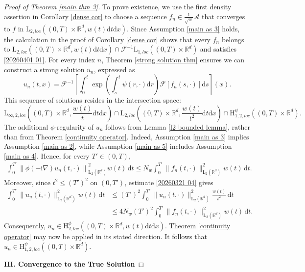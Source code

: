 \documentclass[11pt,reqno]{amsart}
\theoremstyle{definition}
\theoremstyle{remark}
\newcommand\bR{\mathbb{R}}
\newcommand\cA{\mathcal{A}}
\newcommand\cF{\mathcal{F}}
\numberwithin{equation}{section}
\begin{document}
\begin{proof}[Proof of Theorem \ref{main thm 3}]
To prove existence, we use the first density assertion in Corollary \ref{dense cor} to choose a sequence $f_n\in\frac{1}{\sqrt w}\cA$
that converges to $f$ in
$\mathrm{L}_{2,loc}\left((0,T)\times\bR^d,
w(t)\mathrm{d}t\mathrm{d}x\right)$. Since Assumption
\ref{main as 3} holds, the calculation in the proof of Corollary
\ref{dense cor} shows that every $f_n$ belongs to $\mathrm{L}_{2,loc}\left((0,T)\times\bR^d,w(t)\mathrm{d}t\mathrm{d}x\right)\cap\cF^{-1}\mathrm{L}_{1,loc}\left((0,T)\times\bR^d\right)$ and satisfies \eqref{20260401 01}.
For every index $n$, Theorem \ref{strong solution thm} ensures we can construct a strong solution $u_n$, expressed as
$$
u_n(t,x) = \cF^{-1}\left[ \int_0^t \exp\left(\int_s^t\psi(r,\cdot)\mathrm{d}r \right) \cF[f_n(s,\cdot)]\mathrm{d}s \right](x).
$$
This sequence of solutions resides in the intersection space:
$$
\mathrm{L}_{\infty,2, loc}\left( (0,T) \times \bR^d ,\frac{w(t)}{t}\mathrm{d}t \mathrm{d}x\right) \cap \mathrm{L}_{2, loc}\left( (0,T) \times \bR^d,\frac{w(t)}{t^2}\mathrm{d}t\mathrm{d}x \right) \cap  \mathrm{H}_{1,2,loc}^{\psi}\left( (0,T) \times \bR^d\right).
$$
The additional $\phi$-regularity of $u_n$ follows from Lemma
\ref{l2 bounded lemma}, rather than from Theorem
\ref{continuity operator}. Indeed, Assumption \ref{main as 3} implies
Assumption \ref{main as 2}, while Assumption \ref{main as 5} includes
Assumption \ref{main as 4}. Hence, for every $T'\in(0,T)$,
\begin{align*}
\int_0^{T'}\left\|
\phi(-\mathrm{i}\nabla)u_n(t,\cdot)
\right\|_{\mathrm L_2(\bR^d)}^2w(t)\,\mathrm{d}t
\leq
N_w\int_0^{T'}\|f_n(t,\cdot)\|_{\mathrm L_2(\bR^d)}^2
w(t)\,\mathrm{d}t.
\end{align*}
Moreover, since $t^2\leq (T')^2$ on $(0,T')$, estimate
\eqref{20260321 04} gives
\begin{align*}
\int_0^{T'}\|u_n(t,\cdot)\|_{\mathrm L_2(\bR^d)}^2
w(t)\,\mathrm{d}t
&\leq
(T')^2\int_0^{T'}\|u_n(t,\cdot)\|_{\mathrm L_2(\bR^d)}^2
\frac{w(t)}{t^2}\,\mathrm{d}t\\
&\leq
4N_w(T')^2
\int_0^{T'}\|f_n(t,\cdot)\|_{\mathrm L_2(\bR^d)}^2
w(t)\,\mathrm{d}t.
\end{align*}
Consequently, $u_n\in
\mathrm{H}_{2,loc}^{\phi}
\left((0,T)\times\bR^d,w(t)\mathrm{d}t\mathrm{d}x\right)$.
Theorem \ref{continuity operator} may now be applied in its stated direction. 
It follows that $u_n\in\mathrm{H}_{1,2,loc}^{\psi}\left((0,T)\times\bR^d\right)$.

\vspace{2mm}
{\bf III. Convergence to the True Solution}
\vspace{2mm}


\end{proof}
\end{document}
